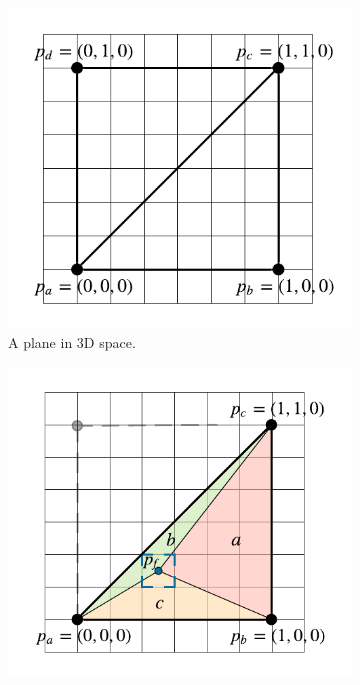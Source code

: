 \begin{figure}[!h]
\centering
\begin{subfigure}{.5\textwidth}
    \centering
    \includegraphics[width=\linewidth]{img/theory/Left-Interpolated.pdf}
    \caption{A plane in 3D space.}
    \label{fig:InterpolationLeft}
\end{subfigure}%
\begin{subfigure}{.5\textwidth}
    \centering
    \includegraphics[width=\linewidth]{img/theory/Right-Interpolated.pdf}

\end{subfigure}
\end{figure}
